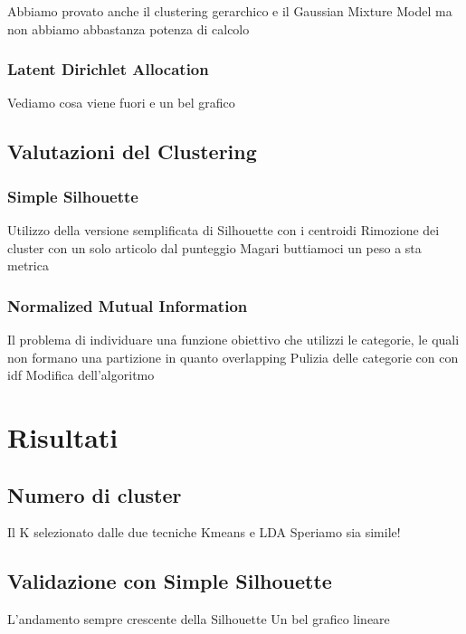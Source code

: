 \documentclass[
12pt, %
a4paper, %
oneside, %
headinclude,footinclude, %
BCOR5mm, %
]{scrartcl}
\begin{document}
			Abbiamo provato anche il clustering gerarchico e il Gaussian Mixture Model
			ma non abbiamo abbastanza potenza di calcolo

		\subsubsection{Latent Dirichlet Allocation}

			Vediamo cosa viene fuori e un bel grafico


	\subsection{Valutazioni del Clustering}

		\subsubsection{Simple Silhouette}

			Utilizzo della versione semplificata di Silhouette con i centroidi
			Rimozione dei cluster con un solo articolo dal punteggio
			Magari buttiamoci un peso a sta metrica

		\subsubsection{Normalized Mutual Information}

			Il problema di individuare una funzione obiettivo che utilizzi le categorie,
			le quali non formano una partizione in quanto overlapping
			Pulizia delle categorie con con idf
			Modifica dell'algoritmo



\section{Risultati}

	\subsection{Numero di cluster}

		Il K selezionato dalle due tecniche Kmeans e LDA
		Speriamo sia simile!

	\subsection{Validazione con Simple Silhouette}

		L'andamento sempre crescente della Silhouette
		Un bel grafico lineare
\end{document}
